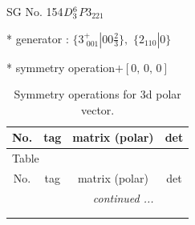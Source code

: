 \documentclass[fleqn,8pt]{jsarticle}
\begin{document}
\setcounter{MaxMatrixCols}{32}

\renewcommand{\tablename}{Table~}
\renewcommand{\figurename}{Figure~}
\begin{center}
\LARGE
SG No. 154\quad$D_{\rm 3}^{6}$\quad$P3_221$\quad[ trigonal ]
\end{center}

* generator : $\{3^{+}_{\,\,001}|0 0 \frac{2}{3}\},\,\,\{2{}_{110}|0\}$

* symmetry operation\quad$+\left[ 0,\, 0,\, 0 \right]$
\renewcommand{\arraystretch}{1.3}
\begin{longtable}{cccc}
\caption{Symmetry operations for 3d polar vector.}
 \\
 \hline \hline
No. & tag & matrix (polar) & det \\ \hline \endfirsthead

\multicolumn{3}{l}{\tablename\ \thetable{}} \\
 \hline \hline
No. & tag & matrix (polar) & det \\ \hline \endhead

 \hline \hline
\multicolumn{3}{r}{\footnotesize\it continued ...} \\ \endfoot

 \hline \hline
\multicolumn{3}{r}{} \\ \endlastfoot


\end{longtable}
\end{document}
